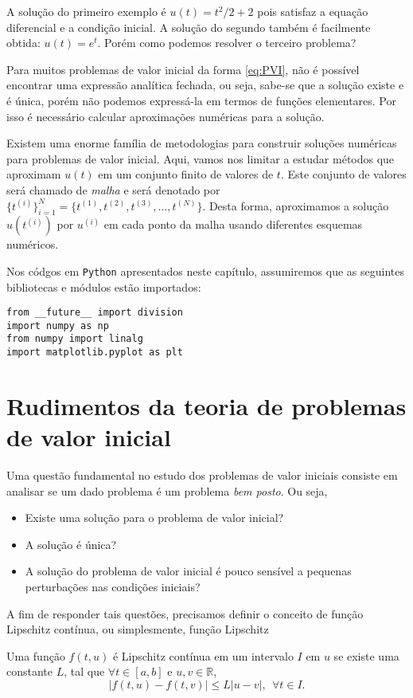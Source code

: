 A solução do primeiro exemplo é $u(t)=t^2/2+2$ pois satisfaz a equação diferencial e a condição inicial. A solução do segundo também é facilmente obtida: $u(t)=e^t$. Porém como podemos resolver o terceiro problema?

Para muitos problemas de valor inicial da forma \eqref{eq:PVI}, não é possível encontrar uma expressão analítica fechada, ou seja, sabe-se que a solução existe e é única, porém não podemos expressá-la em termos de funções elementares. Por isso é necessário calcular aproximações numéricas para a solução.

Existem uma enorme família de metodologias para construir soluções numéricas para problemas de valor inicial. Aqui, vamos nos limitar a estudar métodos que aproximam $u(t)$ em um conjunto finito de valores de $t$. Este conjunto de valores será chamado de \emph{malha} e será denotado por  $\{t^{(i)}\}_{i=1}^N=\{t^{(1)}, t^{(2)}, t^{(3)},\ldots, t^{(N)}\}$. Desta forma, aproximamos a solução $u(t^{(i)})$ por $u^{(i)}$ em cada ponto da malha usando diferentes esquemas numéricos.

\ifispython
Nos códgos em \verb+Python+ apresentados neste capítulo, assumiremos que as seguintes bibliotecas e módulos estão importados:
\begin{verbatim}
from __future__ import division
import numpy as np
from numpy import linalg
import matplotlib.pyplot as plt
\end{verbatim}
\fi

\section{Rudimentos da teoria de problemas de valor inicial}
Uma questão fundamental no estudo dos problemas de valor iniciais consiste em analisar se um dado problema é um problema \emph{bem posto}. Ou seja,
\begin{itemize}
 \item Existe uma solução para o problema de valor inicial?
 \item A solução é única?
 \item A solução do problema de valor inicial é pouco sensível a pequenas perturbações nas condições iniciais?
\end{itemize}

A fim de responder tais questões, precisamos definir o conceito de função Lipschitz contínua, ou simplesmente, função Lipschitz 
\begin{defn}
Uma função $f(t, u)$ é Lipschitz contínua em um intervalo $I$ em $u$ se existe uma constante $L$, tal que $\forall t \in [a, b]$ e $u, v \in \mathbb R$,
\begin{equation}  |f(t, u)-f(t, v)| \leq L|u-v|,~~\forall t\in I.  \end{equation}
\end{defn}

